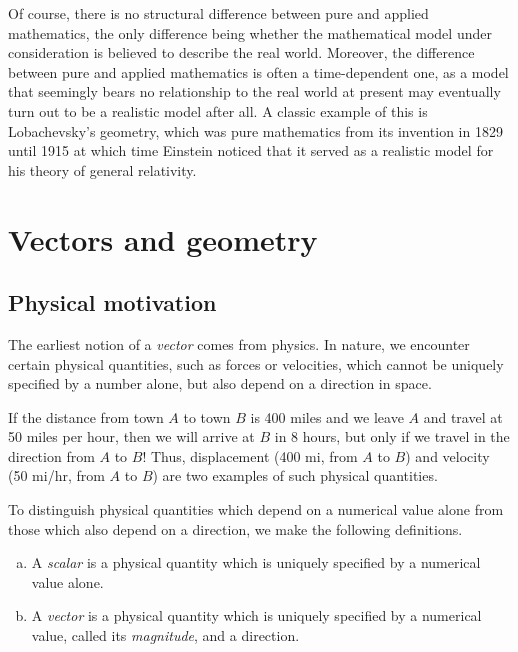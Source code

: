 \documentclass[12pt,letterpaper,reqno]{article}
\numberwithin{equation}{section}
\newcommand{\ti}[1]{\textit{#1}}
\newcommand{\fixme}[1]{{\color{orange}{[#1]}}}
\begin{document}
Of course, there is no structural difference between pure and applied mathematics,  the only difference being whether the mathematical model under consideration is believed to describe the real world. Moreover, the difference between pure and applied mathematics is often a time-dependent one, as a model that seemingly bears no relationship to the real world at present may eventually turn out to be a realistic model after all. A classic example of this is Lobachevsky's geometry, \fixme{Add short description of non-Euclidean geometry and the relation to relativity.} which was pure mathematics from its invention in 1829 until 1915 at which time Einstein noticed that it served as a realistic model for his theory of general relativity.



\section{Vectors and geometry}
\subsection{Physical motivation}
The earliest notion of a \ti{vector} comes from physics. In nature, we encounter certain physical quantities, such as forces or velocities, which cannot be uniquely specified by a number alone, but also depend on a direction in space. 

\begin{example}
If the distance from town $A$ to town $B$ is 400 miles and we leave $A$ and travel at 50 miles per hour, then we will arrive at $B$ in 8 hours, but only if we travel in the direction from $A$ to $B$! Thus, displacement (400 mi, from $A$ to $B$) and velocity (50 mi/hr, from $A$ to $B$) are two examples of such physical quantities.
\end{example}
To distinguish physical quantities which depend on a numerical value alone from those which also depend on a direction, we make the following definitions. 
\begin{defn}
\begin{enumerate}[(a)] \hspace{10cm}
	\item A \ti{scalar} is a physical quantity which is uniquely specified by a numerical value alone.
	\item A \ti{vector} is a physical quantity which is uniquely specified by a numerical value, called its \ti{magnitude}, and a direction.
\end{enumerate}
\end{defn}
\end{document}
